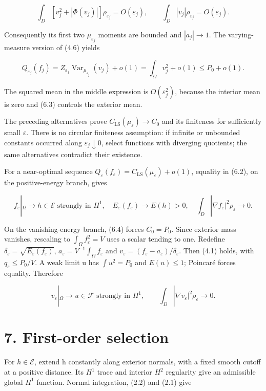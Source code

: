 \documentclass[11pt]{article}
\begin{document}
\[\int_D[v_j^2+|\Phi(v_j)|]\rho_{\varepsilon_j}=O(\varepsilon_j),
\qquad\int_D|v_j|\rho_{\varepsilon_j}=O(\varepsilon_j).\tag{6.3}\]

Consequently its first two \(\mu _{\varepsilon _j}\) moments are bounded
and \(|a_j|\to 1\). The varying-measure version of (4.6) yields

\[Q_{\varepsilon_j}(f_j)
=Z_{\varepsilon_j}\operatorname{Var}_{\mu_{\varepsilon_j}}(v_j)+o(1)
=\int_\Omega v_j^2+o(1)\leq P_0+o(1).\tag{6.4}\]

The squared mean in the middle expression is \(O(\varepsilon _j^{2})\),
because the interior mean is zero and (6.3) controls the exterior mean.

The preceding alternatives prove
\(C_{\mathrm{LS}}(\mu _\varepsilon )\to C_0\) and its finiteness for
sufficiently small \(\varepsilon\). There is no circular finiteness
assumption: if infinite or unbounded constants occurred along
\(\varepsilon _j\downarrow 0\), select functions with diverging
quotients; the same alternatives contradict their existence.

For a near-optimal sequence
\(Q_\varepsilon (f_\varepsilon )=C_{\mathrm{LS}}(\mu _\varepsilon )+o(1)\),
equality in (6.2), on the positive-energy branch, gives

\[f_\varepsilon|_\Omega\to h\in\mathcal E\text{ strongly in }H^1,
\quad E_\varepsilon(f_\varepsilon)\to E(h)>0,
\quad\int_D|\nabla f_\varepsilon|^2\rho_\varepsilon\to0.\tag{6.5}\]

On the vanishing-energy branch, (6.4) forces \(C_0=P_0\). Since exterior
mass vanishes, rescaling to \(\int _\Omega f_\varepsilon ^{2}=V\) uses a
scalar tending to one. Redefine
\(\delta _\varepsilon =\sqrt{E_\varepsilon(f_\varepsilon)}\),
\(a_\varepsilon =V^{-1}\int _\Omega f_\varepsilon\) and
\(v_\varepsilon =(f_\varepsilon -a_\varepsilon )/\delta _\varepsilon\).
Then (4.1) holds, with \(q_\varepsilon \leq P_0/V\). A weak limit u has
\(\int u^{2}=P_0\) and \(E(u)\leq 1\); Poincaré forces equality.
Therefore

\[v_\varepsilon|_\Omega\to u\in\mathcal F\text{ strongly in }H^1,
\qquad\int_D|\nabla v_\varepsilon|^2\rho_\varepsilon\to0.\tag{6.6}\]

\section{7. First-order selection}\label{first-order-selection}

For \(h\in \mathcal{E}\), extend h constantly along exterior normals,
with a fixed smooth cutoff at a positive distance. Its \(H^{1}\) trace
and interior \(H^{2}\) regularity give an admissible global \(H^{1}\)
function. Normal integration, (2.2) and (2.1) give
\end{document}
